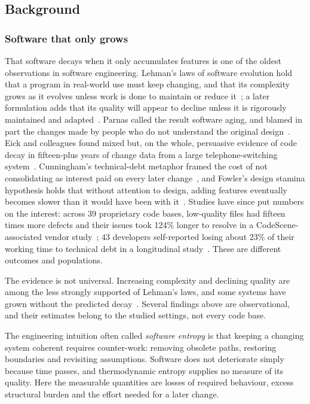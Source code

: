 \subsection{Background}\label{sup:sec:background}

\subsubsection{Software that only grows}\label{sup:sec:decay}

That software decays when it only accumulates features is one of the oldest
observations in software engineering. Lehman's laws of software evolution hold that a
program in real-world use must keep changing, and that its complexity grows as
it evolves unless work is done to maintain or reduce it~\cite{lehman1980laws};
a later formulation adds that its quality will appear to decline unless it is
rigorously maintained and adapted~\cite{lehman1997metrics}. Parnas called the
result software aging, and blamed in part the changes made by people who do
not understand the original design~\cite{parnas1994aging}. Eick and colleagues
found mixed but, on the whole, persuasive evidence of code decay in fifteen-plus
years of change data from a large telephone-switching
system~\cite{eick2001decay}. Cunningham's technical-debt metaphor framed the
cost of not consolidating as interest paid on every later
change~\cite{cunningham1992wycash}, and Fowler's design stamina hypothesis
holds that without attention to design, adding features eventually becomes
slower than it would have been with it~\cite{fowler2007stamina}. Studies have
since put numbers on the interest: across 39 proprietary code bases,
low-quality files had fifteen times more defects and their issues took
124\% longer to resolve in a CodeScene-associated vendor
study~\cite{tornhill2022codered}; 43 developers self-reported losing about
23\% of their working time to technical debt in a longitudinal
study~\cite{besker2018cripples}. These are different outcomes and populations.

The evidence is not universal. Increasing complexity and declining quality
are among the less strongly supported of Lehman's laws, and some systems have
grown without the predicted decay~\cite{herraiz2013laws}. Several findings
above are observational, and their estimates belong to the studied settings,
not every code base.

The engineering intuition often called \emph{software entropy} is that keeping
a changing system coherent requires counter-work: removing obsolete paths,
restoring boundaries and revisiting assumptions. Software does not deteriorate
simply because time passes, and thermodynamic entropy supplies no measure of
its quality. Here the measurable quantities are losses of required behaviour,
excess structural burden and the effort needed for a later change.

